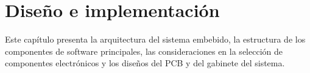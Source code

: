 \chapter{Diseño e implementación} %

Este capítulo presenta la arquitectura del sistema embebido, la estructura de los componentes de software principales, las consideraciones en la selección de componentes electrónicos y los diseños del PCB y del gabinete del sistema.

\label{Chapter3} %


